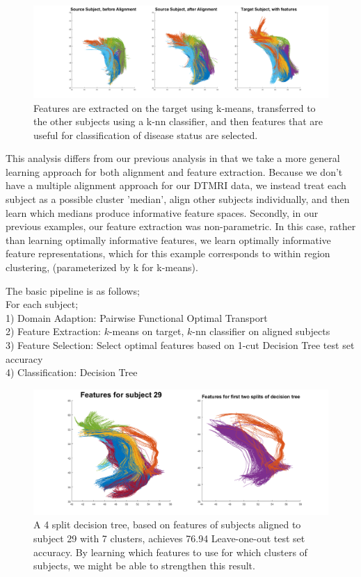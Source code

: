 \documentclass[]{article}
\begin{document}
\begin{figure}
	\includegraphics[width = \linewidth]{./DTMRI_features_6}
	\caption{Features are extracted on the target using k-means, transferred to the other subjects using a k-nn classifier, and then features that are useful for classification of disease status are selected.}
	\label{aligned function}
\end{figure}



This analysis differs from our previous analysis in that we take a more general learning approach for both alignment and feature extraction. Because we don't have a multiple alignment approach for our DTMRI data, we instead treat each subject as a possible cluster 'median', align other subjects individually, and then learn which medians produce informative feature spaces. Secondly, in our previous examples, our feature extraction was non-parametric. In this case, rather than learning optimally informative features, we learn optimally informative feature representations, which for this example corresponds to within region clustering, (parameterized by k for k-means).



The basic pipeline is as follows;\\

\noindent
For each subject;\\
1) Domain Adaption: Pairwise Functional Optimal Transport\\
2) Feature Extraction: $k$-means on target, $k$-nn classifier on aligned subjects\\
3) Feature Selection: Select optimal features based on 1-cut Decision Tree test set accuracy\\
4) Classification: Decision Tree\\

\begin{figure}[h!]
	\includegraphics[width = \linewidth]{./subject29}
	\caption{A 4 split decision tree, based on features of subjects aligned to subject 29 with 7 clusters, achieves 76.94 Leave-one-out test set accuracy. By learning which features to use for which clusters of subjects, we might be able to strengthen this result.} 
	\label{aligned function}
\end{figure}
\end{document}
